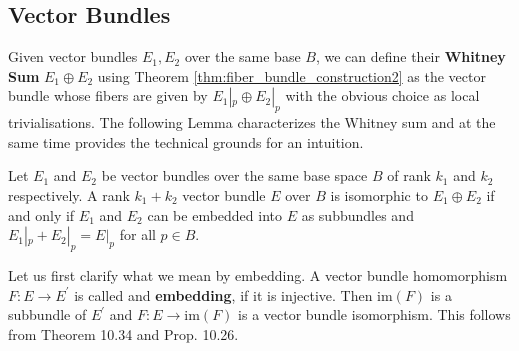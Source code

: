 \subsection{Vector Bundles}


    Given vector bundles $E_1, E_2$ over the same base $B$, we can define their \textbf{Whitney Sum} $E_1 \oplus E_2$ using Theorem \ref{thm:fiber_bundle_construction2} as the vector bundle whose fibers are given by $E_1|_p \oplus E_2|_p$ with the obvious choice as local trivialisations. The following Lemma characterizes the Whitney sum and at the same time provides the technical grounds for an intuition.

    \begin{lemma}
        \label{lem:whitney_sum}
        Let $E_1$ and $E_2$ be vector bundles over the same base space $B$ of rank $k_1$ and $k_2$ respectively. A rank $k_1+k_2$ vector bundle $E$ over $B$ is isomorphic to $E_1 \oplus E_2$ if and only if $E_1$ and $E_2$ can be embedded into $E$ as subbundles and $E_1|_p + E_2|_p = E|_p$ for all $p \in B$.
    \end{lemma}

    Let us first clarify what we mean by embedding. A vector bundle homomorphism $F \colon E \to E^\prime$ is called and \textbf{embedding}, if it is injective. Then $\mathrm{im}(F)$ is a subbundle of $E^\prime$ and $F \colon E \to \mathrm{im}(F)$ is a vector bundle isomorphism. This follows from \cite{lee2011smooth} Theorem 10.34 and Prop. 10.26.


